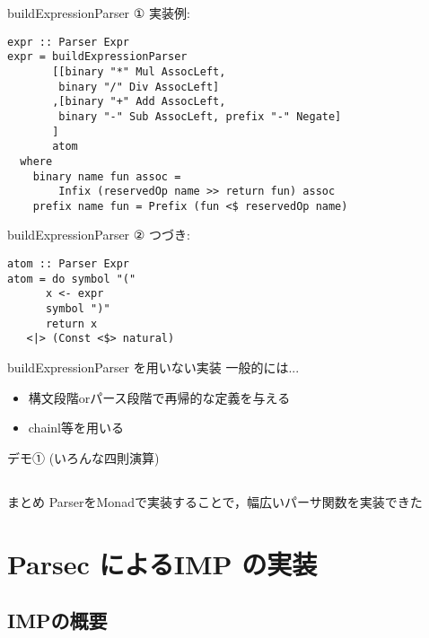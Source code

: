 \documentclass[uplatex,dvipdfmx,ja=standard]{beamer}
\begin{document}
\begin{frame}[fragile]{buildExpressionParser ①}
    実装例:
    \begin{verbatim}
expr :: Parser Expr
expr = buildExpressionParser
       [[binary "*" Mul AssocLeft, 
        binary "/" Div AssocLeft]
       ,[binary "+" Add AssocLeft, 
        binary "-" Sub AssocLeft, prefix "-" Negate]
       ]
       atom
  where
    binary name fun assoc = 
        Infix (reservedOp name >> return fun) assoc
    prefix name fun = Prefix (fun <$ reservedOp name)
    \end{verbatim}

\end{frame}


\begin{frame}[fragile]{buildExpressionParser ②}
    つづき:
    \begin{verbatim}
atom :: Parser Expr
atom = do symbol "("
      x <- expr
      symbol ")"
      return x
   <|> (Const <$> natural)
    \end{verbatim}
\end{frame}

\begin{frame}[fragile]{buildExpressionParser を用いない実装}
    一般的には...
    \begin{itemize}
    \item 構文段階orパース段階で再帰的な定義を与える
    \item chainl等を用いる
    \end{itemize}
\end{frame}

\begin{frame}{デモ①}
    (いろんな四則演算)
\end{frame}

\subsection{}

\begin{frame}{まとめ}
    ParserをMonadで実装することで，幅広いパーサ関数を実装できた
\end{frame}

\section{Parsec によるIMP の実装}

\subsection{IMPの概要}
\end{document}
